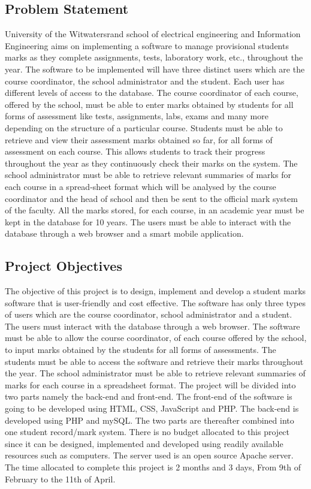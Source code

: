 \documentclass[10pt,onecolumn]{MainDocument}
\begin{document}
\subsection{Problem Statement}

University of the Witwatersrand school of electrical engineering and Information Engineering aims on implementing a software to manage  provisional students marks as they complete assignments, tests, laboratory work, etc., throughout the year. The software to be implemented will have three distinct users which are the course coordinator, the school administrator and the student. Each user has different levels of access to the database. The course coordinator of each course, offered  by the school, must be able to enter marks obtained by students for all forms of assessment like tests, assignments, labs, exams and many more depending on the structure of a particular course. Students must be able to retrieve and view their assessment marks obtained so far, for all forms of assessment on each course. This allows students to track  their progress throughout the year as they continuously check their marks on the system. The school administrator must be able to retrieve relevant summaries of marks for each course in a spread-sheet format which will be analysed by the course coordinator and the head of school and then be sent to the official mark system of the faculty. All the marks stored, for each course, in an academic year must be kept in the database for 10 years. The users must be able to interact with the database through a web browser and a smart mobile application. 
 
\subsection{Project Objectives}

The objective of this project is to design, implement and develop a student marks software that is user-friendly and cost effective. The software has only three types of users which are the course coordinator, school administrator and a student. The users must interact with the database through a web browser. The software must be able to allow the course coordinator, of each course offered by the school, to input marks obtained by the students for all forms of assessments. The students must be able to access the software and retrieve their marks throughout the year. The school administrator must be able to retrieve relevant summaries of marks for each course in a spreadsheet format. The project will be divided into two parts namely the back-end and front-end. The front-end of the software is going to be developed using HTML, CSS, JavaScript and PHP. The back-end is developed using PHP and mySQL. The two parts are thereafter combined into one student record/mark system. There is no budget allocated to this project since it can be designed, implemented and developed using readily available resources such as computers. The server used is an open source Apache server. The time allocated to complete this project is 2 months and 3 days, From 9th of February to the 11th of April. 
\end{document}
